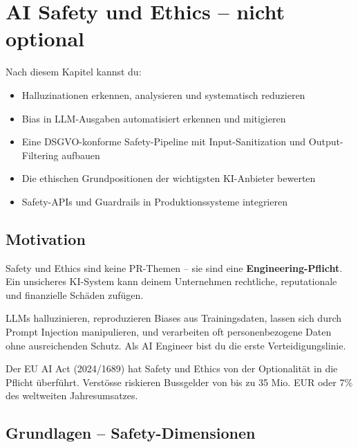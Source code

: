 \chapter{AI Safety und Ethics -- nicht optional}

\label{chap:ai_safety_ethics}

\begin{lernziele}
Nach diesem Kapitel kannst du:
\begin{itemize}
    \item Halluzinationen erkennen, analysieren und systematisch reduzieren
    \item Bias in LLM-Ausgaben automatisiert erkennen und mitigieren
    \item Eine DSGVO-konforme Safety-Pipeline mit Input-Sanitization und Output-Filtering aufbauen
    \item Die ethischen Grundpositionen der wichtigsten KI-Anbieter bewerten
    \item Safety-APIs und Guardrails in Produktionssysteme integrieren
\end{itemize}
\end{lernziele}

\section{Motivation}

Safety und Ethics sind keine PR-Themen -- sie sind eine \textbf{Engineering-Pflicht}. Ein unsicheres KI-System kann deinem Unternehmen rechtliche, reputationale und finanzielle Schäden zufügen.

LLMs halluzinieren, reproduzieren Biases aus Trainingsdaten, lassen sich durch Prompt Injection manipulieren, und verarbeiten oft personenbezogene Daten ohne ausreichenden Schutz. Als AI Engineer bist du die erste Verteidigungslinie.

Der EU AI Act (2024/1689) hat Safety und Ethics von der Optionalität in die Pflicht überführt. Verstösse riskieren Bussgelder von bis zu 35 Mio. EUR oder 7\% des weltweiten Jahresumsatzes.

\section{Grundlagen -- Safety-Dimensionen}

